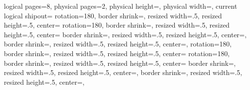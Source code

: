 
\usepackage[utf8]{inputenc}     %
\usepackage{datatool}           %
\usepackage{booktabs}           %
\usepackage{scrletter}          %

\usepackage{pgfmorepages}

{%
  \edef\pgfpageoptionheight{\the\paperheight}
  \edef\pgfpageoptionwidth{\the\paperwidth}
  \def\pgfpageoptionborder{0pt}
  \def\pgfpageoptionfirstshipout{1}
}%
{%
  \pgfpagesphysicalpageoptions%
  {%
    logical pages=8,%
    physical pages=2,%
    physical height=\pgfpageoptionheight,%
    physical width=\pgfpageoptionwidth,%
    current logical shipout=\pgfpageoptionfirstshipout%
  }
  {%
    rotation=180,
      border shrink=\pgfpageoptionborder,%
      resized width=.5\pgfphysicalwidth,%
      resized height=.5\pgfphysicalheight,%
      center=\pgfpoint{.25\pgfphysicalwidth}{.75\pgfphysicalheight}%
    }%
  {%
    rotation=180,
      border shrink=\pgfpageoptionborder,%
      resized width=.5\pgfphysicalwidth,%
      resized height=.5\pgfphysicalheight,%
      center=\pgfpoint{.75\pgfphysicalwidth}{.75\pgfphysicalheight}%
    }%
    {%
      border shrink=\pgfpageoptionborder,%
      resized width=.5\pgfphysicalwidth,%
      resized height=.5\pgfphysicalheight,%
      center=\pgfpoint{.25\pgfphysicalwidth}{.25\pgfphysicalheight},%
    }%
    {%
      border shrink=\pgfpageoptionborder,%
      resized width=.5\pgfphysicalwidth,%
      resized height=.5\pgfphysicalheight,%
      center=\pgfpoint{.75\pgfphysicalwidth}{.25\pgfphysicalheight},%
    }%
    {%
      rotation=180,
      border shrink=\pgfpageoptionborder,%
      resized width=.5\pgfphysicalwidth,%
      resized height=.5\pgfphysicalheight,%
      center=\pgfpoint{.25\pgfphysicalwidth}{.75\pgfphysicalheight}%
    }%
    {%
      rotation=180,
      border shrink=\pgfpageoptionborder,%
      resized width=.5\pgfphysicalwidth,%
      resized height=.5\pgfphysicalheight,%
      center=\pgfpoint{.75\pgfphysicalwidth}{.75\pgfphysicalheight}%
    }%
    {%
      border shrink=\pgfpageoptionborder,%
      resized width=.5\pgfphysicalwidth,%
      resized height=.5\pgfphysicalheight,%
      center=\pgfpoint{.25\pgfphysicalwidth}{.25\pgfphysicalheight},%
    }%
    {%
      border shrink=\pgfpageoptionborder,%
      resized width=.5\pgfphysicalwidth,%
      resized height=.5\pgfphysicalheight,%
      center=\pgfpoint{.75\pgfphysicalwidth}{.25\pgfphysicalheight},%
    }%
}

